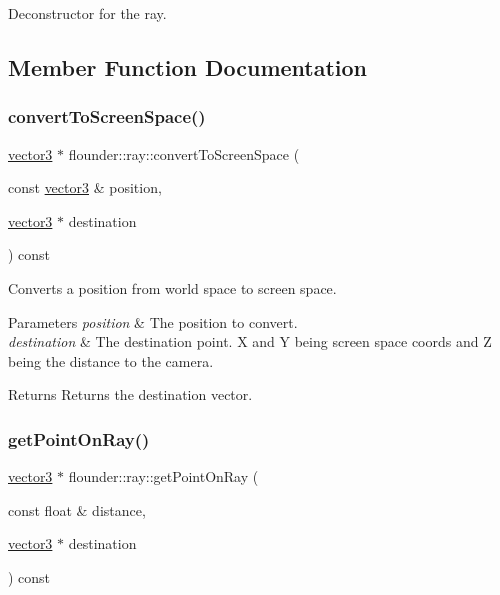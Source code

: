 Deconstructor for the ray. 



\subsection{Member Function Documentation}
\mbox{\label{classflounder_1_1ray_a6770cbc5a1826141b46e08be39d542b5}} 
\subsubsection{\texorpdfstring{convert\+To\+Screen\+Space()}{convertToScreenSpace()}}
{\footnotesize\ttfamily \hyperlink{classflounder_1_1vector3}{vector3} $\ast$ flounder\+::ray\+::convert\+To\+Screen\+Space (\begin{DoxyParamCaption}\item[{const \hyperlink{classflounder_1_1vector3}{vector3} \&}]{position,  }\item[{\hyperlink{classflounder_1_1vector3}{vector3} $\ast$}]{destination }\end{DoxyParamCaption}) const}



Converts a position from world space to screen space. 


\begin{DoxyParams}{Parameters}
{\em position} & The position to convert. \\
\hline
{\em destination} & The destination point. X and Y being screen space coords and Z being the distance to the camera. \\
\hline
\end{DoxyParams}
\begin{DoxyReturn}{Returns}
Returns the destination vector. 
\end{DoxyReturn}
\mbox{\label{classflounder_1_1ray_ab08982d3adaaa4ea6db3e1615749a298}} 
\subsubsection{\texorpdfstring{get\+Point\+On\+Ray()}{getPointOnRay()}}
{\footnotesize\ttfamily \hyperlink{classflounder_1_1vector3}{vector3} $\ast$ flounder\+::ray\+::get\+Point\+On\+Ray (\begin{DoxyParamCaption}\item[{const float \&}]{distance,  }\item[{\hyperlink{classflounder_1_1vector3}{vector3} $\ast$}]{destination }\end{DoxyParamCaption}) const}



